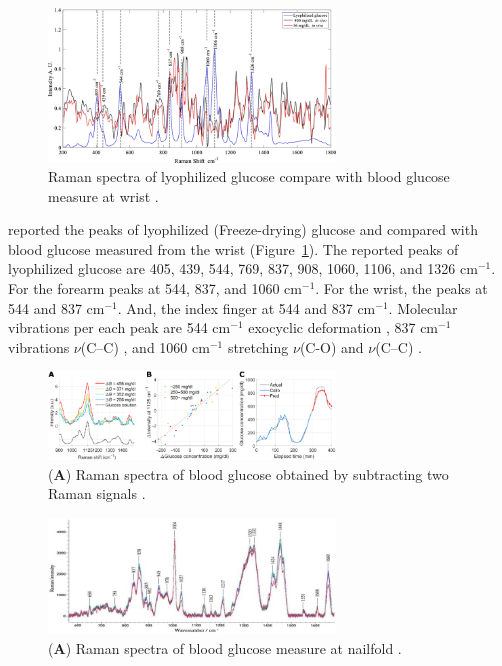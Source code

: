 \begin{figure}
    \caption{Raman spectra of lyophilized glucose compare with blood glucose measure at wrist \citep{sitecompare}.}
    \centerline{\includegraphics[width=3in]{figures/lyophilizedGlucose-RS.png}}
    \label{fig:lyophilizedGlucose-RS}
\end{figure}

\cite{sitecompare} reported the peaks of lyophilized (Freeze-drying) glucose and compared with blood glucose measured from the wrist (Figure~\ref{fig:lyophilizedGlucose-RS}).
The reported peaks of lyophilized glucose are 405, 439, 544, 769, 837, 908, 1060, 1106, and 1326 $\text{cm}^{-1}$.
For the forearm peaks at 544, 837, and 1060 $\text{cm}^{-1}$.
For the wrist, the peaks at 544 and 837 $\text{cm}^{-1}$. 
And, the index finger at 544 and 837 $\text{cm}^{-1}$. 
Molecular vibrations per each peak are 544 $\text{cm}^{-1}$ exocyclic deformation \citep{exocyclicdeformation}, 
837 $\text{cm}^{-1}$ vibrations $\nu$(C–C) \citep{vibrationsc-c}, 
and 1060 $\text{cm}^{-1}$ stretching $\nu$(C-O) and $\nu$(C–C) \citep{stretchingc-oc-c, exocyclicdeformation}.

\begin{figure}
    \caption{(\textbf{A}) Raman spectra of blood glucose obtained by subtracting two Raman signals \citep{directGlucose}.}
    \centerline{\includegraphics[width=3in]{figures/bloodGlucose-DeltaG.png}}
    \label{fig:bloodGlucose-DeltaG}
\end{figure}

\begin{figure}
    \caption{(\textbf{A}) Raman spectra of blood glucose measure at nailfold \citep{ramanNailFold2019}.}
    \centerline{\includegraphics[width=3in]{figures/bloodGlucose-nailfold.jpg}}
    \label{fig:bloodGlucose-nailfold}
\end{figure}

